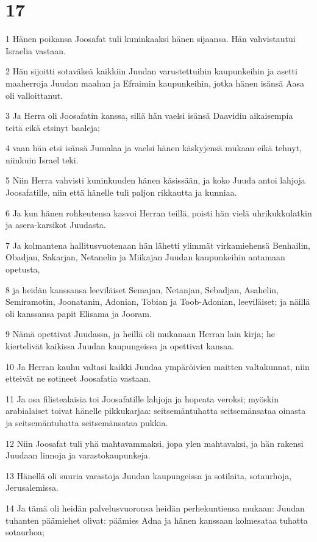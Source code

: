 \chapter{17}

\par 1 Hänen poikansa Joosafat tuli kuninkaaksi hänen sijaansa. Hän vahvistautui Israelia vastaan.
\par 2 Hän sijoitti sotaväkeä kaikkiin Juudan varustettuihin kaupunkeihin ja asetti maaherroja Juudan maahan ja Efraimin kaupunkeihin, jotka hänen isänsä Aasa oli valloittanut.
\par 3 Ja Herra oli Joosafatin kanssa, sillä hän vaelsi isänsä Daavidin aikaisempia teitä eikä etsinyt baaleja;
\par 4 vaan hän etsi isänsä Jumalaa ja vaelsi hänen käskyjensä mukaan eikä tehnyt, niinkuin Israel teki.
\par 5 Niin Herra vahvisti kuninkuuden hänen käsissään, ja koko Juuda antoi lahjoja Joosafatille, niin että hänelle tuli paljon rikkautta ja kunniaa.
\par 6 Ja kun hänen rohkeutensa kasvoi Herran teillä, poisti hän vielä uhrikukkulatkin ja asera-karsikot Juudasta.
\par 7 Ja kolmantena hallitusvuotenaan hän lähetti ylimmät virkamiehensä Benhailin, Obadjan, Sakarjan, Netanelin ja Miikajan Juudan kaupunkeihin antamaan opetusta,
\par 8 ja heidän kanssansa leeviläiset Semajan, Netanjan, Sebadjan, Asahelin, Semiramotin, Joonatanin, Adonian, Tobian ja Toob-Adonian, leeviläiset; ja näillä oli kanssansa papit Elisama ja Jooram.
\par 9 Nämä opettivat Juudassa, ja heillä oli mukanaan Herran lain kirja; he kiertelivät kaikissa Juudan kaupungeissa ja opettivat kansaa.
\par 10 Ja Herran kauhu valtasi kaikki Juudaa ympäröivien maitten valtakunnat, niin etteivät ne sotineet Joosafatia vastaan.
\par 11 Ja osa filistealaisia toi Joosafatille lahjoja ja hopeata veroksi; myöskin arabialaiset toivat hänelle pikkukarjaa: seitsemäntuhatta seitsemänsataa oinasta ja seitsemäntuhatta seitsemänsataa pukkia.
\par 12 Niin Joosafat tuli yhä mahtavammaksi, jopa ylen mahtavaksi, ja hän rakensi Juudaan linnoja ja varastokaupunkeja.
\par 13 Hänellä oli suuria varastoja Juudan kaupungeissa ja sotilaita, sotaurhoja, Jerusalemissa.
\par 14 Ja tämä oli heidän palvelusvuoronsa heidän perhekuntiensa mukaan: Juudan tuhanten päämiehet olivat: päämies Adna ja hänen kanssaan kolmesataa tuhatta sotaurhoa;
